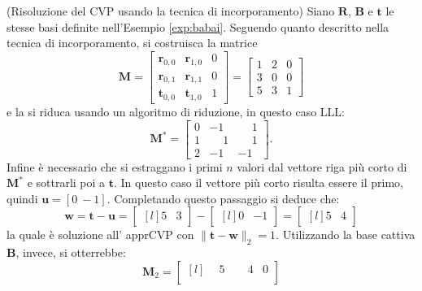\begin{exmp}(Risoluzione del CVP usando la tecnica di incorporamento)
Siano $\mathbf{R}$, $\mathbf{B}$ e $\mathbf{t}$ le stesse basi definite nell'Esempio \ref{exp:babai}.
Seguendo quanto descritto nella tecnica di incorporamento, si costruisca la matrice 
\[
    \mathbf{M} =
    \begin{bmatrix}
        \mathbf{r}_{0,0} & \mathbf{r}_{1,0} & 0\\
        \mathbf{r}_{0,1} & \mathbf{r}_{1,1} & 0\\
        \mathbf{t}_{0,0} & \mathbf{t}_{1,0} & 1
    \end{bmatrix}
    =
    \begin{bmatrix}
        1 & 2 & 0 \\
        3 & 0 & 0 \\
        5 & 3 & 1 
    \end{bmatrix}
\]
e la si riduca usando un algoritmo di riduzione, in questo caso LLL:
\begin{equation*}
    \mathbf{M}^* =
    \begin{bmatrix}
        0 & -1 & \phantom{-}1 \\
        1 & \phantom{-}1 & \phantom{-}1 \\
        2 & -1 & -1 
    \end{bmatrix}.
\end{equation*}
Infine è necessario che si estraggano i primi $n$ valori dal vettore riga più corto di 
$\mathbf{M}^*$ e sottrarli poi a $\mathbf{t}$. In questo caso il vettore più corto risulta
essere il primo, quindi $\mathbf{u} = [0 \ -1]$. Completando questo passaggio si deduce che:
\begin{equation*}
    \mathbf{w} = \mathbf{t} - \mathbf{u} =
    \begin{bmatrix*}[l]
        5 & 3
    \end{bmatrix*}
    -
    \begin{bmatrix*}[l]
        0 & -1
    \end{bmatrix*}
    =
    \begin{bmatrix*}[l]
        5 & 4
    \end{bmatrix*}
\end{equation*}
la quale è soluzione all' apprCVP con $\|\mathbf{t}-\mathbf{w}\|_2=1$.
Utilizzando la base cattiva $\mathbf{B}$, invece, si otterrebbe:
\begin{equation*}
    \mathbf{M}_2 =
    \begin{bmatrix*}[l]
        \phantom{-}5 & \phantom{-}4 & 0\\

\end{bmatrix*}
\end{equation*}
\end{exmp}
